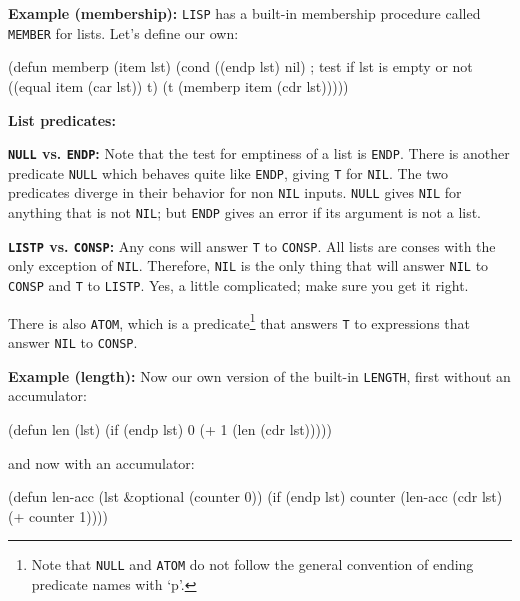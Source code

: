\documentclass[a4paper,11pt]{article}
\begin{document}
\begin{uenum}

\item {\bf Example (membership):} \Verb+LISP+ has a built-in membership procedure called \Verb+MEMBER+ for lists. Let's define our own:

\begin{lispcode}
(defun memberp (item lst)
  (cond ((endp lst) nil) ; test if lst is empty or not
        ((equal item (car lst)) t)
        (t (memberp item (cdr lst)))))
\end{lispcode}

\item {\bf List predicates:}
\begin{uenumi}
\item {\bf \Verb+NULL+ vs. \Verb+ENDP+:}
Note that the test for emptiness of a list is \Verb+ENDP+. There is another predicate \Verb+NULL+ which behaves quite like \Verb+ENDP+, giving \Verb+T+ for \Verb+NIL+. The two predicates diverge in their behavior for non \Verb+NIL+ inputs. \Verb+NULL+ gives \Verb+NIL+ for anything that is not \Verb+NIL+; but \Verb+ENDP+ gives an error if its argument is not a list. 

\item {\bf \Verb+LISTP+ vs. \Verb+CONSP+:} Any cons will answer \Verb+T+ to \Verb+CONSP+. All lists are conses with the only exception of \Verb+NIL+. Therefore, \Verb+NIL+  is the only thing that will answer \Verb+NIL+ to \Verb+CONSP+ and \Verb+T+ to \Verb+LISTP+. Yes, a little complicated; make sure you get it right.

There is also \Verb+ATOM+, which is a predicate\footnote{Note that \Verb+NULL+ and \Verb+ATOM+ do not follow the general convention of ending predicate names with `p'.} that answers \Verb+T+ to expressions that answer \Verb+NIL+ to \Verb+CONSP+. 
\end{uenumi}

\item {\bf Example (length):} Now our own version of the built-in \Verb+LENGTH+, first without an accumulator:

\begin{lispcode}
(defun len (lst)
  (if (endp lst)
    0
    (+ 1 (len (cdr lst)))))
\end{lispcode}

and now with an accumulator:

\begin{lispcode}
(defun len-acc (lst &optional (counter 0))
  (if (endp lst)
    counter
    (len-acc (cdr lst) (+ counter 1))))
\end{lispcode}


\end{uenum}
\end{document}

